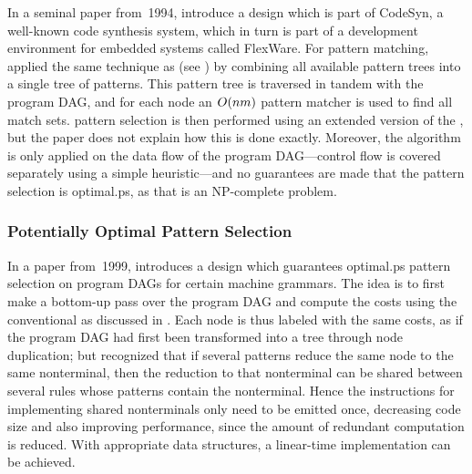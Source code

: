 In a seminal paper from~1994, \citeauthor{Liem1994} introduce a design which is
part of \gls{CodeSyn}, a well-known code synthesis system, which in turn is part
of a development environment for embedded systems called \gls{FlexWare}.
%
For
\gls{pattern matching}, \citeauthor{Liem1994} applied the same technique as
\textcite{Weingart1973} (see
) by combining all
available \glspl{pattern tree} into a single \gls{tree} of \glspl{pattern}.
%
This
\gls{pattern tree} is traversed in tandem with the \gls{program DAG}, and for
each \gls{node} an \mbox{$O(nm)$} \gls{pattern matcher} is used to find all
\glspl{match set}.
%
\Gls{pattern selection} is then performed using an extended
version of the \tDPalgorithm, but the paper does not explain how this is done
exactly.
%
Moreover, the algorithm is only applied on the data flow of the
\gls{program DAG}---control flow is covered separately using a simple
heuristic---and no guarantees are made that the \gls{pattern selection} is
\gls{optimal.ps}, as that is an NP-complete problem.


\subsubsection{Potentially Optimal Pattern Selection}

In a paper from~1999, \textcite{Ertl1999} introduces a design which guarantees
\gls{optimal.ps} \gls{pattern selection} on \glspl{program DAG} for certain
\glspl{machine grammar}.
%
The idea is to first make a bottom-up pass over
the \gls{program DAG} and compute the costs using the conventional \tDPalgorithm
as discussed in .
%
Each \gls{node} is thus labeled with
the same costs, as if the \gls{program DAG} had first been transformed into a
\gls{tree} through \gls{node} duplication; but \citeauthor{Ertl1999} recognized
that if several \glspl{pattern} reduce the same \gls{node} to the same
\gls{nonterminal}, then the reduction to that \gls{nonterminal} can be shared
between several \glspl{rule} whose \glspl{pattern} contain the
\gls{nonterminal}.
%
 Hence the \glspl{instruction} for implementing shared
\glspl{nonterminal} only need to be emitted once, decreasing code size and also
improving performance, since the amount of redundant computation is
reduced.
%
With appropriate data structures, a linear-time implementation can be
achieved.

